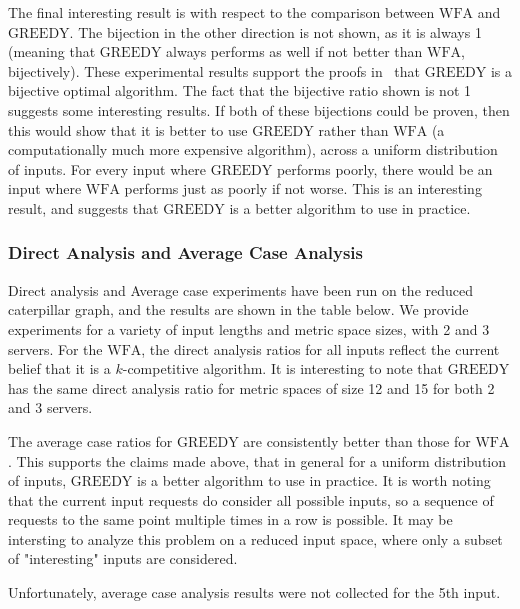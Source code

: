 The final interesting result is with respect to the comparison between $\mathrm{WFA}$ and $\mathrm{GREEDY}$. The bijection in the other direction is not shown, as it is always 1 (meaning that $\mathrm{GREEDY}$ always performs as well if not better than $\mathrm{WFA}$, bijectively). These experimental results support the proofs in~\cite{bij2016} that $\mathrm{GREEDY}$ is a bijective optimal algorithm. The fact that the bijective ratio shown is not 1 suggests some interesting results. If both of these bijections could be proven, then this would show that it is better to use $\mathrm{GREEDY}$ rather than $\mathrm{WFA}$ (a computationally much more expensive algorithm), across a uniform distribution of inputs. For every input where $\mathrm{GREEDY}$ performs poorly, there would be an input where $\mathrm{WFA}$ performs just as poorly if not worse. This is an interesting result, and suggests that $\mathrm{GREEDY}$ is a better algorithm to use in practice.

\subsubsection*{Direct Analysis and Average Case Analysis}
Direct analysis and Average case experiments have been run on the reduced caterpillar graph, and the results are shown in the table below. We provide experiments for a variety of input lengths and metric space sizes, with 2 and 3 servers. For the $\mathrm{WFA}$, the direct analysis ratios for all inputs reflect the current belief that it is a $k$-competitive algorithm. It is interesting to note that $\mathrm{GREEDY}$ has the same direct analysis ratio for metric spaces of size 12 and 15 for both 2 and 3 servers.

The average case ratios for $\mathrm{GREEDY}$ are consistently better than those for $\mathrm{WFA}$. This supports the claims made above, that in general for a uniform distribution of inputs, $\mathrm{GREEDY}$ is a better algorithm to use in practice. It is worth noting that the current input requests do consider all possible inputs, so a sequence of requests to the same point multiple times in a row is possible. It may be intersting to analyze this problem on a reduced input space, where only a subset of "interesting" inputs are considered.

Unfortunately, average case analysis results were not collected for the 5th input. 

